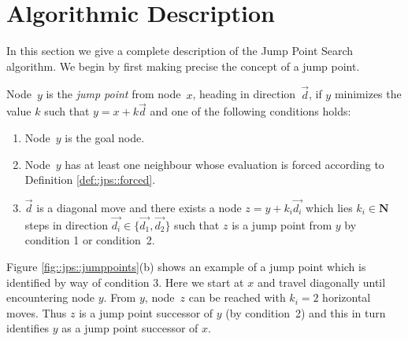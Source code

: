 \section{Algorithmic Description}
\label{cha::jps::algorithm}


In this section we give a complete description of the Jump Point Search
algorithm.  We begin by first making precise the concept of a jump point.

\begin{definition}
\label{def::jps::jump}
Node~$y$ is the \emph{jump point} from node~$x$, heading in direction~$\vec{d}$,
if $y$ minimizes the value $k$ such that $y = x + k \vec{d}$ and one of the
following conditions holds:
\begin{enumerate}
\item{Node~$y$ is the goal node.}
\item{Node~$y$ has at least one neighbour whose evaluation is forced according 
to Definition \ref{def::jps::forced}.}
\item{$\vec{d}$ is a diagonal move and there exists a node $z = y +
k_i\vec{d_{i}}$ which lies $k_i \in \mathbf{N}$ steps in direction $\vec{d_i} \in
\{\vec{d_1},\vec{d_2}\}$ such that $z$ is a jump point from $y$ by condition 1 or condition~2.}
\end{enumerate}
\end{definition}

Figure \ref{fig::jps::jumppoints}(b) shows an example of a jump point which is
identified by way of condition 3.
Here we start at $x$ and travel diagonally until encountering node $y$. 
From $y$, node~$z$ can be reached with $k_i = 2$ horizontal moves.
Thus $z$ is a jump point successor of $y$ (by condition~2) and this in turn
identifies $y$ as a jump point successor of $x$.



